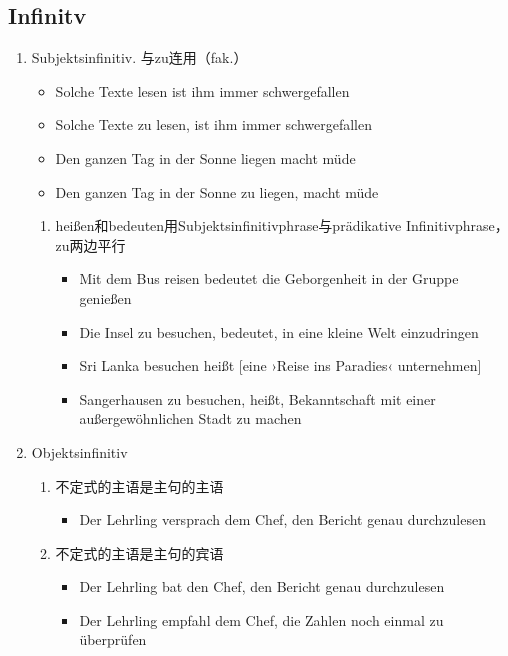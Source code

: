 \documentclass[UTF8]{report}
\begin{document}
\subsection{Infinitv}

\begin{enumerate}
    \item Subjektsinfinitiv. 与zu连用（fak.）
    \begin{itemize}
        \item Solche Texte lesen ist ihm immer schwergefallen
        \item Solche Texte zu lesen, ist ihm immer schwergefallen
        \item Den ganzen Tag in der Sonne liegen macht müde
        \item Den ganzen Tag in der Sonne zu liegen, macht müde
    \end{itemize}
    \begin{enumerate}
        \item heißen和bedeuten用Subjektsinfinitivphrase与prädikative Infinitivphrase，zu两边平行
    \begin{itemize}
        \item Mit dem Bus reisen bedeutet die Geborgenheit in der Gruppe genießen
        \item Die Insel zu besuchen, bedeutet, in eine kleine Welt einzudringen
        \item Sri Lanka besuchen heißt [eine ›Reise ins Paradies‹ unternehmen]
        \item Sangerhausen zu besuchen, heißt, Bekanntschaft mit einer außergewöhnlichen Stadt zu machen
    \end{itemize}
    \end{enumerate}
    \item Objektsinfinitiv
    \begin{enumerate}
        \item 不定式的主语是主句的主语
        \begin{itemize}
            \item Der Lehrling versprach dem Chef, den Bericht genau durchzulesen
        \end{itemize}
        \item 不定式的主语是主句的宾语
        \begin{itemize}
            \item Der Lehrling bat den Chef, den Bericht genau durchzulesen
            \item Der Lehrling empfahl dem Chef, die Zahlen noch einmal zu überprüfen

\end{itemize}
\end{enumerate}
\end{enumerate}
\end{document}
